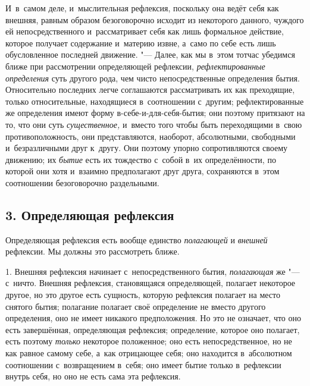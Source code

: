 И~в~самом деле, и~мыслительная рефлексия, поскольку она ведёт себя как
внешняя, равным образом безоговорочно исходит из некоторого данного,
чуждого ей непосредственного и~рассматривает себя как лишь формальное
действие, которое получает содержание и~материю извне, а~само по себе есть
лишь обусловленное последней движение. "--- Далее, как мы в~этом тотчас
убедимся ближе при рассмотрении определяющей рефлексии,
{\em рефлектированные определения} суть другого рода,
чем чисто непосредственные определения бытия. Относительно последних легче
соглашаются рассматривать их как преходящие, только относительные,
находящиеся в~соотношении с~другим; рефлектированные же определения имеют
форму в-себе-и-для-себя-бытия; они поэтому притязают на то, что они суть
{\em существенное,} и~вместо того чтобы быть
переходящими в~свою противоположность, они представляются, наоборот,
абсолютными, свободными и~безразличными друг к~другу. Они поэтому упорно
сопротивляются своему движению; их {\em бытие} есть их
тождество с~собой в~их определённости, по которой они хотя и~взаимно
предполагают друг друга, сохраняются в~этом соотношении безоговорочно
раздельными.

\subsection[3. Определяющая рефлексия]{3. Определяющая рефлексия}
Определяющая рефлексия есть вообще единство
{\em полагающей} и {\em внешней}
рефлексии. Мы должны это рассмотреть ближе.

1. Внешняя рефлексия начинает с~непосредственного бытия,
{\em полагающая} же "--- с~ничто. Внешняя рефлексия,
становящаяся определяющей, полагает некоторое другое, но это другое есть
сущность, которую рефлексия полагает на место снятого бытия; полагание
полагает своё определение не вместо другого определения, оно не имеет
никакого предположения. Но это не означает, что оно есть завершённая,
определяющая рефлексия; определение, которое оно полагает, есть поэтому
{\em только} некоторое положенное; оно есть
непосредственное, но не как равное самому себе, а~как отрицающее себя; оно
находится в~абсолютном соотношении с~возвращением в~себя; оно имеет бытие
только в~рефлексии внутрь себя, но оно не есть сама эта рефлексия.


